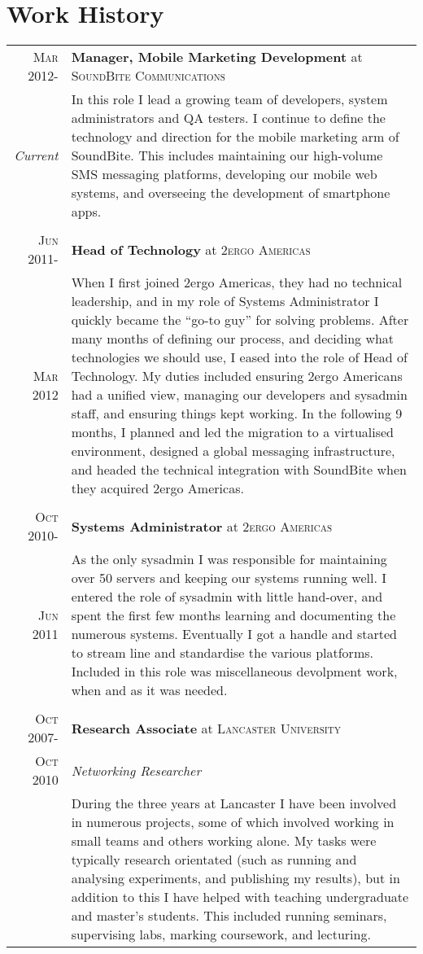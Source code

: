 \documentclass[a4paper,10pt]{article}
\begin{document}
\section{Work History}
\begin{tabular}{r|p{13.5cm}}

 \textsc{Mar 2012-} & \textbf{Manager, Mobile Marketing Development} at \textsc{SoundBite Communications} \\
 \emph{Current}     & In this role I lead a growing team of developers, system administrators and QA testers. I continue to define
			the technology and direction for the mobile marketing arm of SoundBite. This includes maintaining our high-volume
			SMS messaging platforms, developing our mobile web systems, and overseeing the development of smartphone apps.\\
&\\
 \textsc{Jun 2011-} & \textbf{Head of Technology} at \textsc{2ergo Americas} \\
 \textsc{Mar 2012}  & When I first joined 2ergo Americas, they had no technical leadership, and in my role of Systems Administrator
			I quickly became the ``go-to guy'' for solving problems. After many months of defining our process, and
			deciding what technologies we should use, I eased into the role of Head of Technology. My duties included ensuring 
			2ergo Americans had a unified view, managing our developers and sysadmin staff, and ensuring things kept working.
			In the following 9 months, I planned and led the migration to a virtualised environment, designed a global messaging
			infrastructure, and headed the technical integration with SoundBite when they acquired 2ergo Americas. \\
&\\
 \textsc{Oct 2010-} & \textbf{Systems Administrator} at \textsc{2ergo Americas} \\
 \textsc{Jun 2011}  %
                    & As the only sysadmin I was responsible for maintaining over 50 servers and keeping our systems running well. 
			I entered the role of sysadmin with little hand-over, and spent the first few months learning and documenting the numerous systems.
			Eventually I got a handle and started to stream line and standardise the various platforms. Included in this role was miscellaneous devolpment work,
			when and as it was needed. \\
&\\
 \textsc{Oct 2007-} & \textbf{Research Associate} at \textsc{Lancaster University} \\
 \textsc{Oct 2010}  & \emph{Networking Researcher}\\
                    & During the three years at Lancaster I have been involved in numerous projects, some of which involved working in small teams and others working alone. My tasks were typically research orientated (such as running and analysing experiments, and publishing my results), but in addition to this I have helped with teaching undergraduate and master's students. This included running seminars, supervising labs, marking coursework, and lecturing.\\


\end{tabular}
\end{document}
